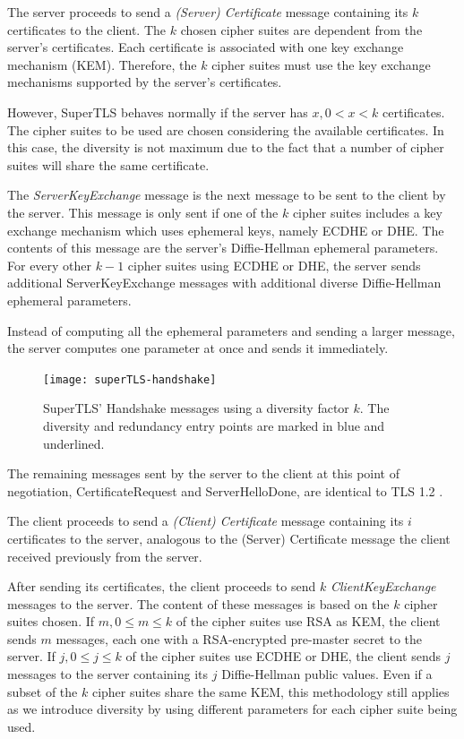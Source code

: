 \documentclass{sig-alternate-05-2015}
\begin{document}
The server proceeds to send a \textit{(Server) Certificate} message containing its $k$ certificates to the client. The $k$ chosen cipher suites are dependent from the server's certificates. Each certificate is associated with one key exchange mechanism (KEM). Therefore, the $k$ cipher suites must use the key exchange mechanisms supported by the server's certificates.

However, SuperTLS behaves normally if the server has $x, 0 < x < k$ certificates. The cipher suites to be used are chosen considering the available certificates. In this case, the diversity is not maximum due to the fact that a number of cipher suites will share the same certificate.

The \textit{ServerKeyExchange} message is the next message to be sent to the client by the server. This message is only sent if one of the $k$ cipher suites includes a key exchange mechanism which uses ephemeral keys, namely ECDHE or DHE. The contents of this message are the server's Diffie-Hellman ephemeral parameters. For every other $k - 1$ cipher suites using ECDHE or DHE, the server sends additional ServerKeyExchange messages with additional diverse Diffie-Hellman ephemeral parameters.

Instead of computing all the ephemeral parameters and sending a larger message, the server computes one parameter at once and sends it immediately.

\begin{figure}[t]
\texttt{[image: superTLS-handshake]}
\centering
\caption{SuperTLS' Handshake messages using a diversity factor $k$. The diversity and redundancy entry points are marked in blue and underlined.}
\label{fig:superTLS-example}
\end{figure}

The remaining messages sent by the server to the client at this point of negotiation, CertificateRequest and ServerHelloDone, are identical to TLS 1.2 \cite{TLS1.2-5246}.

The client proceeds to send a \textit{(Client) Certificate} message containing its $i$ certificates to the server, analogous to the (Server) Certificate message the client received previously from the server.

After sending its certificates, the client proceeds to send $k$ \textit{ClientKeyExchange} messages to the server. The content of these messages is based on the $k$ cipher suites chosen. If $m, 0 \leq m \leq k$ of the cipher suites use RSA as KEM, the client sends $m$ messages, each one with a RSA-encrypted pre-master secret to the server. If $j, 0 \leq j \leq k$ of the cipher suites use ECDHE or DHE, the client sends $j$ messages to the server containing its $j$ Diffie-Hellman public values. Even if a subset of the $k$ cipher suites share the same KEM, this methodology still applies as we introduce diversity by using different parameters for each cipher suite being used.
\end{document}
